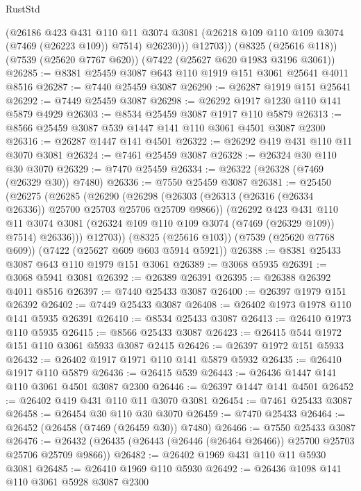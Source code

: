 \begin{lexlean}{RustStd}
\begin{coremodule}
            (@26186
              @423
              @431
              @110
              @11
              @3074
              @3081
              (@26218 @109 @110 @109 @3074 (@7469 (@26223 @109)) @7514)
              @26230)))
        @12703))
    (@8325 (@25616 @118))
    (@7539 (@25620 @7767 @620))
    (@7422 (@25627 @620 @1983 @3196 @3061))
@26285 := @8381 @25459 @3087 @643 @110 @1919 @151 @3061 @25641 @4011 @8516
@26287 := @7440 @25459 @3087
@26290 := @26287 @1919 @151 @25641
@26292 := @7449 @25459 @3087
@26298 := @26292 @1917 @1230 @110 @141 @5879 @4929
@26303 := @8534 @25459 @3087 @1917 @110 @5879
@26313 := @8566 @25459 @3087 @539 @1447 @141 @110 @3061 @4501 @3087 @2300
@26316 := @26287 @1447 @141 @4501
@26322 := @26292 @419 @431 @110 @11 @3070 @3081
@26324 := @7461 @25459 @3087
@26328 := @26324 @30 @110 @30 @3070
@26329 := @7470 @25459
@26334 := @26322 (@26328 (@7469 (@26329 @30)) @7480)
@26336 := @7550 @25459 @3087
@26381 := @25450
    (@26275
      (@26285
        (@26290
          (@26298
            (@26303 (@26313 (@26316 (@26334 @26336)) @25700 @25703 @25706 @25709 @9866))
            (@26292
              @423
              @431
              @110
              @11
              @3074
              @3081
              (@26324 @109 @110 @109 @3074 (@7469 (@26329 @109)) @7514)
              @26336)))
        @12703))
    (@8325 (@25616 @103))
    (@7539 (@25620 @7768 @609))
    (@7422 (@25627 @609 @603 @5914 @5921))
@26388 := @8381 @25433 @3087 @643 @110 @1979 @151 @3061
@26389 := @3068 @5935
@26391 := @3068 @5941 @3081
@26392 := @26389 @26391
@26395 := @26388 @26392 @4011 @8516
@26397 := @7440 @25433 @3087
@26400 := @26397 @1979 @151 @26392
@26402 := @7449 @25433 @3087
@26408 := @26402 @1973 @1978 @110 @141 @5935 @26391
@26410 := @8534 @25433 @3087
@26413 := @26410 @1973 @110 @5935
@26415 := @8566 @25433 @3087
@26423 := @26415 @544 @1972 @151 @110 @3061 @5933 @3087 @2415
@26426 := @26397 @1972 @151 @5933
@26432 := @26402 @1917 @1971 @110 @141 @5879 @5932
@26435 := @26410 @1917 @110 @5879
@26436 := @26415 @539
@26443 := @26436 @1447 @141 @110 @3061 @4501 @3087 @2300
@26446 := @26397 @1447 @141 @4501
@26452 := @26402 @419 @431 @110 @11 @3070 @3081
@26454 := @7461 @25433 @3087
@26458 := @26454 @30 @110 @30 @3070
@26459 := @7470 @25433
@26464 := @26452 (@26458 (@7469 (@26459 @30)) @7480)
@26466 := @7550 @25433 @3087
@26476 := @26432 (@26435 (@26443 (@26446 (@26464 @26466)) @25700 @25703 @25706 @25709 @9866))
@26482 := @26402 @1969 @431 @110 @11 @5930 @3081
@26485 := @26410 @1969 @110 @5930
@26492 := @26436 @1098 @141 @110 @3061 @5928 @3087 @2300

\end{coremodule}
\end{lexlean}
